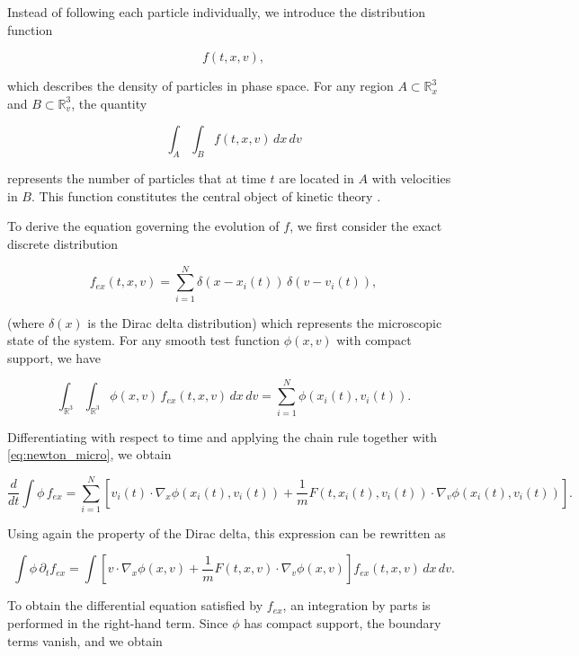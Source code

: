 \documentclass[11pt,a4paper,twoside,pdf]{article}
\numberwithin{equation}{section}
\begin{document}
\medskip

Instead of following each particle individually, we introduce the distribution
function


\[
f(t,x,v),
\]


which describes the density of particles in phase space. For any region
$A\subset\mathbb{R}^3_x$ and $B\subset\mathbb{R}^3_v$, the quantity


\[
\int_A\int_B f(t,x,v)\,dx\,dv
\]


represents the number of particles that at time $t$ are located in $A$ with
velocities in $B$. This function constitutes the central object of kinetic theory \cite{romeroedp}.

\medskip


To derive the equation governing the evolution of $f$, we first consider the exact discrete distribution

\begin{equation}
f_{ex}(t,x,v)=\sum_{i=1}^N \delta(x-x_i(t))\,\delta(v-v_i(t)),
\label{eq:f_ex}
\end{equation}

(where $\delta(x)$ is the Dirac delta distribution) which represents the microscopic state of the system. For any smooth
test function $\phi(x,v)$ with compact support, we have


\[
\int_{\mathbb{R}^3}\int_{\mathbb{R}^3} \phi(x,v)\,f_{ex}(t,x,v)\,dx\,dv
= \sum_{i=1}^N \phi(x_i(t),v_i(t)).
\]



Differentiating with respect to time and applying the chain rule together with
\eqref{eq:newton_micro}, we obtain


\[
\frac{d}{dt}\int \phi\,f_{ex}
= \sum_{i=1}^N \left[
v_i(t)\cdot\nabla_x\phi(x_i(t),v_i(t))
+ \frac{1}{m}F(t,x_i(t),v_i(t))\cdot\nabla_v\phi(x_i(t),v_i(t))
\right].
\]



Using again the property of the Dirac delta, this expression can
be rewritten as


\[
\int \phi\,\partial_t f_{ex}
= \int \left[
v\cdot\nabla_x\phi(x,v)
+ \frac{1}{m}F(t,x,v)\cdot\nabla_v\phi(x,v)
\right] f_{ex}(t,x,v)\,dx\,dv.
\]



\medskip

To obtain the differential equation satisfied by $f_{ex}$, an
integration by parts is performed in the right-hand term. Since $\phi$ has
compact support, the boundary terms vanish, and we obtain
\end{document}
